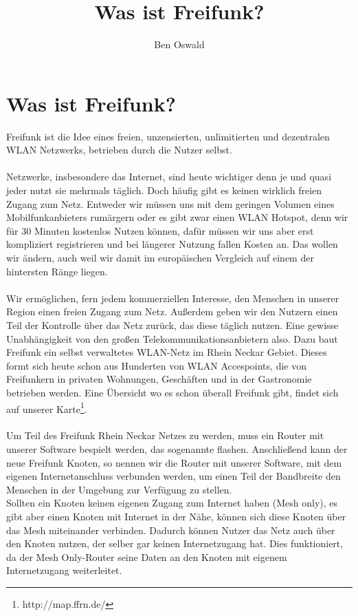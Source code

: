 \documentclass[10pt,a4paper]{article}
\author{Ben Oswald}
\title{Was ist Freifunk?}
\begin{document}

\section*{Was ist Freifunk?}

Freifunk ist die Idee eines freien, unzensierten, unlimitierten und dezentralen WLAN Netzwerks, betrieben
durch die Nutzer selbst.
\\\\
Netzwerke, insbesondere das Internet, sind heute wichtiger denn je und quasi jeder nutzt sie mehrmals
täglich. Doch häufig gibt es keinen wirklich freien Zugang zum Netz. Entweder wir müssen uns mit dem geringen
Volumen eines Mobilfunkanbieters rumärgern oder es gibt zwar einen WLAN Hotspot, denn wir für 30 Minuten kostenlos
Nutzen können, dafür müssen wir uns aber erst kompliziert registrieren und bei längerer Nutzung fallen Kosten an.
Das wollen wir ändern, auch weil wir damit im europäischen Vergleich auf einem der hintersten Ränge liegen.
\\\\
Wir ermöglichen, fern jedem kommerziellen Interesse, den Menschen in unserer Region einen freien Zugang zum Netz. Außerdem
geben wir den Nutzern einen Teil der Kontrolle über das Netz zurück, das diese täglich nutzen. Eine gewisse Unabhängigkeit
von den großen Telekommunikationsanbietern also. Dazu baut Freifunk ein selbst verwaltetes WLAN-Netz im Rhein Neckar Gebiet.
Dieses formt sich heute schon aus Hunderten von WLAN Accespoints, die von Freifunkern in privaten Wohnungen, Geschäften 
und in der Gastronomie betrieben werden. Eine Übersicht wo es schon überall Freifunk gibt, findet sich auf unserer Karte\footnote{http://map.ffrn.de/}.
\\\\
Um Teil des Freifunk Rhein Neckar Netzes zu werden, muss ein Router mit unserer Software bespielt werden, das sogenannte \glqq flashen\grqq.
Anschließend kann der neue Freifunk Knoten, so nennen wir die Router mit unserer Software, mit dem eigenen Internetanschluss verbunden werden,
um einen Teil der Bandbreite den Menschen in der Umgebung zur Verfügung zu stellen.\\
Sollten ein Knoten keinen eigenen Zugang zum Internet haben (Mesh only), es gibt aber einen Knoten mit Internet in der Nähe, können sich diese Knoten über
das Mesh miteinander verbinden. Dadurch können Nutzer das Netz auch über den Knoten nutzen, der selber gar keinen Internetzugang hat. Dies funktioniert,
da der \glqq Mesh Only\grqq-Router seine Daten an den Knoten mit eigenem Internetzugang weiterleitet.
\end{document}
